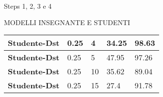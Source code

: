 \begin{subsection}{Steps 1, 2, 3 e 4}
\begin{frame}{MODELLI INSEGNANTE E STUDENTI}
\begin{minipage}{\linewidth}
\begin{minipage}{0.50\linewidth}
\begin{center}
{\begin{tabular}{|M{1.7cm}||M{1.3cm}|M{1.3cm}||M{1.3cm}|M{1.3cm}|}
              \hline
              {\bfseries{Studente-Dst}} & 0.25 & 4 & \color{red}34.25 & \color{red}98.63\\
              \hline
              {\bfseries{Studente-Dst}} & 0.25 & 5 & \color{red}47.95 & \color{red}97.26\\
              \hline
              {\bfseries{Studente-Dst}} & 0.25 & 10 & \color{red}35.62 & \color{red}89.04\\
              \hline
              {\bfseries{Studente-Dst}} & 0.25 & 15 & \color{red}27.4 & \color{red}91.78\\
              \hline
           \end{tabular}}
      \end{center}
      \end{minipage}
    \end{minipage}
  \end{frame}
\end{subsection}
